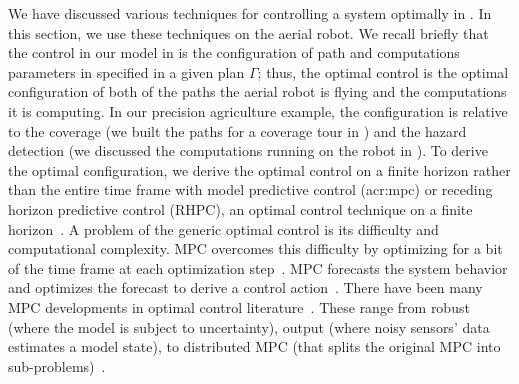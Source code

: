 We have discussed various techniques for controlling a system optimally in . In this section, we use these techniques on the aerial robot. We recall briefly that the control in our model in  is the configuration of path and computations parameters in  specified in a given plan $\Gamma$; thus, the optimal control is the optimal configuration of both of the paths the aerial robot is flying and the computations it is computing. In our precision agriculture example, the configuration is relative to the coverage (we built the paths for a coverage tour in ) and the hazard detection (we discussed the computations running on the robot in ). To derive the optimal configuration, we derive the optimal control on a finite horizon rather than the entire time frame with model predictive control (\Gls{acr:mpc}) or receding horizon predictive control (RHPC), an optimal control technique on a finite horizon~\citep{camacho2007model}. A problem of the generic optimal control is its difficulty and computational complexity. MPC overcomes this difficulty by optimizing for a bit of the time frame at each optimization step~\citep{camacho2007model}. MPC forecasts the system behavior and optimizes the forecast to derive a control action~\citep{rawlings2017model}. There have been many MPC developments in optimal control literature~\citep{rawlings2017model}. These range from robust (where the model is subject to uncertainty), output (where noisy sensors' data estimates a model state), to distributed MPC (that splits the original MPC into sub-problems)~\citep{camacho2007model,rawlings2017model,kwon2006receding,rossiter2004model,wang2009model}.

